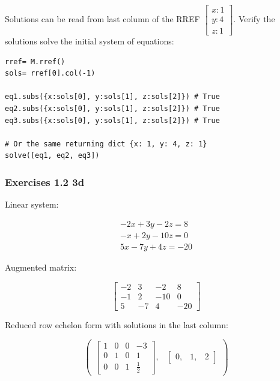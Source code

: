 Solutions can be read from last column of the RREF $\left[\begin{matrix}x:1\\y:4\\z:1\end{matrix}\right]$. Verify the solutions solve
the initial system of equations:

\begin{verbatim}
rref= M.rref()
sols= rref[0].col(-1)

eq1.subs({x:sols[0], y:sols[1], z:sols[2]}) # True
eq2.subs({x:sols[0], y:sols[1], z:sols[2]}) # True
eq3.subs({x:sols[0], y:sols[1], z:sols[2]}) # True

# Or the same returning dict {x: 1, y: 4, z: 1}
solve([eq1, eq2, eq3]) 
\end{verbatim}

\subsubsection{Exercises 1.2 3d}

Linear system:

\begin{equation}\label{eq:na}
\begin{matrix}
    - 2 x + 3 y - 2 z = 8 \\
    - x + 2 y - 10 z = 0 \\
    5 x - 7 y + 4 z = -20
\end{matrix}
\end{equation}

Augmented matrix:

\begin{equation}\label{eq:na}
\left[\begin{matrix}-2 & 3 & -2 & 8\\-1 & 2 & -10 & 0\\5 & -7 & 4 & -20\end{matrix}\right]
\end{equation}

Reduced row echelon form with solutions in the last column:

\begin{equation}\label{eq:na}
\begin{pmatrix}\left[\begin{matrix}1 & 0 & 0 & -3 \\
                                   0 & 1 & 0 & 1 \\
                                   0 & 0 & 1 &
\frac{1}{2}\end{matrix}\right], & \begin{bmatrix}0, & 1, & 2\end{bmatrix}\end{pmatrix}
\end{equation}

